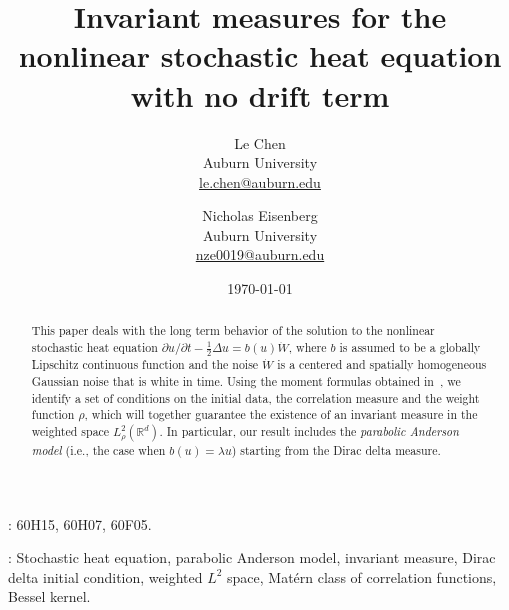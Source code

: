 \documentclass[a4paper,11pt]{article}%
\title{Invariant measures for the nonlinear stochastic heat equation with no drift term}
\author{
  Le Chen           \\Auburn University\\\url{le.chen@auburn.edu}\\ \and
  Nicholas Eisenberg\\Auburn University\\\url{nze0019@auburn.edu}
  }
\date{\today}
\theoremstyle{plain}
\theoremstyle{definition}
\numberwithin{equation}{section}
\newcommand{\R}{\mathbb{R}}
\begin{document}
\maketitle

\begin{abstract}
  This paper deals with the long term behavior of the solution to the nonlinear stochastic heat
  equation $\partial u /\partial t - \frac{1}{2}\Delta u = b(u)\dot{W}$, where $b$ is assumed to be
  a globally Lipschitz continuous function and the noise $\dot{W}$ is a centered and spatially
  homogeneous Gaussian noise that is white in time. Using the moment formulas obtained
  in~\cite{chen.huang:19:comparison,chen.kim:19:nonlinear}, we identify a set of conditions on the
  initial data, the correlation measure and the weight function $\rho$, which will together
  guarantee the existence of an invariant measure in the weighted space $L^2_\rho(\R^d)$. In
  particular, our result includes the \textit{parabolic Anderson model} (i.e., the case when $b(u) =
  \lambda u$) starting from the Dirac delta measure.
\end{abstract}

\smallskip

: 60H15, 60H07, 60F05.
\smallskip

: Stochastic heat equation, parabolic Anderson model, invariant measure,
Dirac delta initial condition, weighted $L^2$ space, Mat\'ern class of correlation functions, Bessel
kernel. \smallskip

\setcounter{tocdepth}{2}
{
  \hypersetup{linkcolor=black}
  \tableofcontents
}

\end{document}
